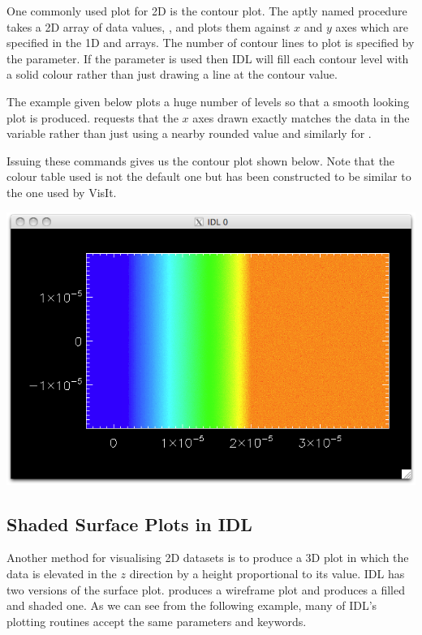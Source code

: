   One commonly used plot for 2D is the contour plot. The aptly named
   procedure takes a 2D array of data values, ,
  and plots them against $x$ and $y$ axes which are specified in the
  1D  and  arrays. The number of contour lines to plot is
  specified by the  parameter. If the  parameter
  is used then IDL will fill each contour level with a solid colour rather
  than just drawing a line at the contour value.

  The example given below plots a huge number of levels so that a smooth
  looking plot is produced.  requests that the $x$ axes drawn
  exactly matches the data in the  variable rather than just using
  a nearby rounded value and similarly for .
  Issuing these commands gives us the contour plot shown below. Note that
  the colour table used is not the default one but has been constructed to
  be similar to the one used by VisIt.
  \begin{center}
    \includegraphics[width=0.8\linewidth]{images/idl_contour}
  \end{center}


\subsection{Shaded Surface Plots in IDL}
  Another method for visualising 2D datasets is to produce a 3D plot in
  which the data is elevated in the $z$ direction by a height proportional
  to its value. IDL has two versions of the surface plot. 
  produces a wireframe plot and  produces a filled and
  shaded one. As we can see from the following example, many of IDL's
  plotting routines accept the same parameters and keywords.

